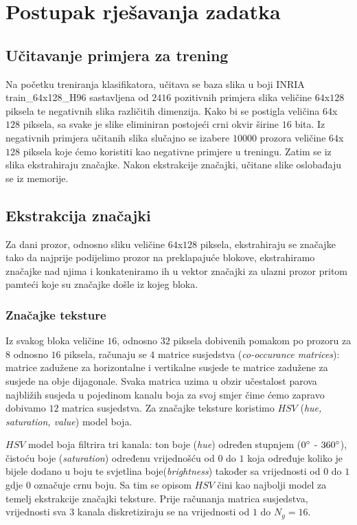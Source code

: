 \documentclass[seminar]{fer}
\begin{document}
\chapter{Postupak rješavanja zadatka}
\section{Učitavanje primjera za trening}
Na početku treniranja klasifikatora, učitava se baza slika u boji INRIA  train\_64x128\_H96 sastavljena od $2416$ pozitivnih primjera slika veličine $64$x$128$ piksela te negativnih slika različitih dimenzija. Kako bi se postigla veličina $64$x$128$ piksela, sa svake je slike eliminiran postojeći crni okvir širine $16$ bita. Iz negativnih primjera učitanih slika slučajno se izabere $10000$ prozora veličine $64$x$128$ piksela koje ćemo koristiti kao negativne primjere u treningu. Zatim se iz slika ekstrahiraju značajke. Nakon ekstrakcije značajki, učitane slike oslobađaju se iz memorije. 

\section{Ekstrakcija značajki}
Za dani prozor, odnosno sliku veličine $64$x$128$ piksela, ekstrahiraju se značajke tako da najprije podijelimo prozor na preklapajuće blokove, ekstrahiramo značajke nad njima i konkateniramo ih u vektor značajki za ulazni prozor pritom pamteći koje su značajke došle iz kojeg bloka.

\subsection{Značajke teksture}
Iz svakog bloka veličine $16$, odnosno $32$ piksela dobivenih pomakom po prozoru za $8$ odnosno $16$ piksela, računaju se $4$ 
 matrice susjedstva (\emph{co-occurance matrices}): matrice zadužene za horizontalne i vertikalne susjede te matrice zadužene za susjede na obje dijagonale. Svaka matrica uzima u obzir učestalost parova najbližih susjeda u pojedinom kanalu boja za svoj smjer čime ćemo zapravo dobivamo $12$ matrica susjedstva. Za značajke teksture koristimo $HSV$ (\emph{hue, saturation, value}) model boja. 
 
$HSV$ model boja filtrira tri kanala: ton boje (\emph{hue}) određen stupnjem ($0\degree$ - $360\degree$), čistoću boje (\emph{saturation}) određenu vrijednošću od $0$ do $1$ koja određuje koliko je bijele dodano u boju te svjetlina boje(\emph{brightness}) također sa vrijednosti od $0$ do $1$ gdje $0$ označuje crnu boju. Sa tim se opisom $HSV$ čini kao najbolji model za temelj ekstrakcije značajki teksture. Prije računanja matrica susjedstva, vrijednosti sva 3 kanala diskretiziraju se na vrijednosti od $1$ do $N_g = 16$.
\end{document}
